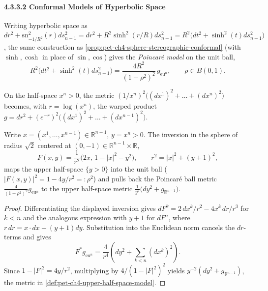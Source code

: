 \paragraph{4.3.3.2 Conformal Models of Hyperbolic Space}

\begin{proposition}
  \label{prop:pet-ch4-poincare-disc-model}

  Writing hyperbolic space as
  $dr^2+\mathrm{sn}_{-1/R^2}^2(r)ds_{n-1}^2=dr^2+R^2\sinh^2(r/R)ds_{n-1}^2
  =R^2\big(dt^2+\sinh^2(t)ds_{n-1}^2\big)$, the same construction as
  \cref{prop:pet-ch4-sphere-stereographic-conformal} (with $\sinh,\cosh$ in
  place of $\sin,\cos$) gives the \emph{Poincaré model} on the unit ball,
  \[
    R^2\big(dt^2+\sinh^2(t)ds_{n-1}^2\big)=\frac{4R^2}{(1-\rho^2)^2}\,g_{\mathrm{eu}^n},
    \qquad\rho\in B(0,1).
  \]
\end{proposition}

\begin{definition}
  \label{def:pet-ch4-upper-half-space-model}


  On the half-space $x^n>0$, the metric $(1/x^n)^2\big((dx^1)^2+\dots+(dx^n)^2\big)$
  becomes, with $r=\log(x^n)$, the warped product
  $g=dr^2+(e^{-r})^2\big((dx^1)^2+\dots+(dx^{n-1})^2\big)$.
\end{definition}

\begin{theorem}
  \label{thm:pet-ch4-inversion-isometry}

  Write $x=(x^1,\dots,x^{n-1})\in\mathbb{R}^{n-1}$, $y=x^n>0$. The inversion in the
  sphere of radius $\sqrt2$ centered at $(0,-1)\in\mathbb{R}^{n-1}\times\mathbb{R}$,
  \[
    F(x,y)=\frac1{r^2}\big(2x,\,1-|x|^2-y^2\big),\qquad r^2=|x|^2+(y+1)^2,
  \]
  maps the upper half-space $\{y>0\}$ into the unit ball ($|F(x,y)|^2=1-4y/r^2=:\rho^2$)
  and pulls back the Poincaré ball metric $\tfrac4{(1-\rho^2)^2}g_{\mathrm{eu}^n}$
  to the upper half-space metric $\tfrac1{y^2}\big(dy^2+g_{\mathbb{R}^{n-1}}\big)$.
\end{theorem}
\begin{proof}
  \sketch
  Differentiating the displayed inversion gives
  $dF^k=2\,dx^k/r^2-4x^k\,dr/r^3$ for $k<n$ and the analogous expression with
  $y+1$ for $dF^n$, where $r\,dr=x\cdot dx+(y+1)dy$. Substitution into the
  Euclidean norm cancels the $dr$-terms and gives
  \[
    F^*g_{\mathrm{eu}^n}=\frac4{r^4}
    \left(dy^2+\sum_{k<n}(dx^k)^2\right).
  \]
  Since $1-|F|^2=4y/r^2$, multiplying by $4/(1-|F|^2)^2$ yields
  $y^{-2}(dy^2+g_{\mathbb R^{n-1}})$, the metric in
  \cref{def:pet-ch4-upper-half-space-model}.
\end{proof}

